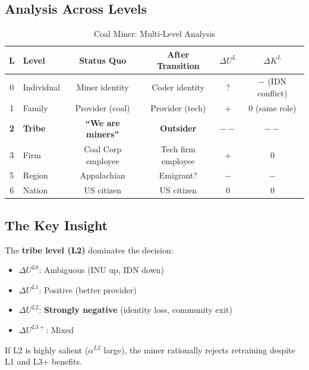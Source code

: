 \subsection{Analysis Across Levels}

\begin{table}[htbp]
\centering
\caption{Coal Miner: Multi-Level Analysis}
\label{tab:aaa-miner}
\renewcommand{\arraystretch}{1.4}
\small
\begin{tabular}{@{}clcccc@{}}
\toprule
\textbf{L} & \textbf{Level} & \textbf{Status Quo} & \textbf{After Transition} & \textbf{$\Delta U^L$} & \textbf{$\Delta K^L$} \\
\midrule
0 & Individual & Miner identity & Coder identity & ? & $-$ (IDN conflict) \\
1 & Family & Provider (coal) & Provider (tech) & + & 0 (same role) \\
\textbf{2} & \textbf{Tribe} & \textbf{``We are miners''} & \textbf{Outsider} & \textbf{$--$} & \textbf{$--$} \\
3 & Firm & Coal Corp employee & Tech firm employee & + & 0 \\
5 & Region & Appalachian & Emigrant? & $-$ & $-$ \\
6 & Nation & US citizen & US citizen & 0 & 0 \\
\bottomrule
\end{tabular}
\end{table}

\subsection{The Key Insight}

\begin{tcolorbox}[colback=red!5!white, colframe=red!50!black, title=Critical Finding]
The \textbf{tribe level (L2)} dominates the decision:
\begin{itemize}
\item $\Delta U^{L0}$: Ambiguous (INU up, IDN down)
\item $\Delta U^{L1}$: Positive (better provider)
\item $\Delta U^{L2}$: \textbf{Strongly negative} (identity loss, community exit)
\item $\Delta U^{L3+}$: Mixed
\end{itemize}

If L2 is highly salient ($\alpha^{L2}$ large), the miner rationally rejects retraining 
despite L1 and L3+ benefits.
\end{tcolorbox}

